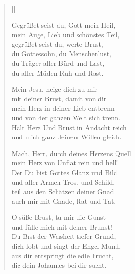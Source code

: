 \begin{multicols}{2}
\settowidth{\versewidth}{Mach, Herr, durch deines Herzens Quell}
\begin{verse}[\versewidth]


 Gegrüßet seist du, Gott mein Heil,\\
mein Auge, Lieb und schönstes Teil,\\
gegrüßet seist du, werte Brust,\\
du Gottessohn, du Menschenlust,\\
du Träger aller Bürd und Last,\\
du aller Müden Ruh und Rast.

 Mein Jesu, neige dich zu mir\\
mit deiner Brust, damit von dir\\
mein Herz in deiner Lieb entbrenn\\
und von der ganzen Welt sich trenn.\\
Halt Herz Und Brust in Andacht reich\\
und mich ganz deinem Willen gleich.

 Mach, Herr, durch deines Herzens Quell\\
mein Herz von Unflat rein und hell!\\
Der Du bist Gottes Glanz und Bild\\
und aller Armen Trost und Schild,\\
teil aus den Schätzen deiner Gnad\\
auch mir mit Gnade, Rat und Tat.

 O süße Brust, tu mir die Gunst\\
und fülle mich mit deiner Brunst!\\
Du Bist der Weisheit tiefer Grund,\\
dich lobt und singt der Engel Mund,\\
aus dir entspringt die edle Frucht,\\
die dein Johannes bei dir sucht.

\end{verse}
\end{multicols}

